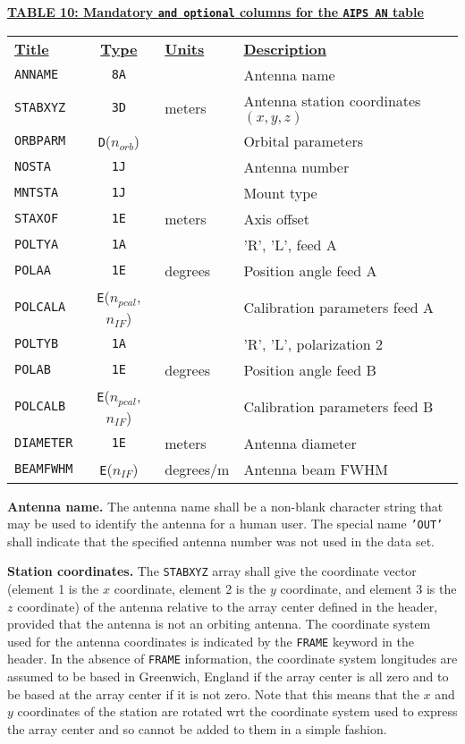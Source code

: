 \documentclass[twoside]{article}
\newcommand{\Me}[1]{\textcolor{mecol}{#1}}
\newcommand{\nif}{$n_{IF}$}
\newcommand{\norb}{$n_{orb}$}
\newcommand{\npcal}{$n_{pcal}$}
\begin{document}
\begin{center}
\underline{\bf{TABLE 10: Mandatory {\tt and optional} columns for
    the {\tt AIPS AN} table}}\\
\begin{tabular}{lcll}
\noalign{\vspace{2pt}} \label{ta:ANcols}
\underline{{\bf Title\vphantom{y}}} & \underline{\bf{Type}} &
   \underline{{\bf Units\vphantom{y}}} & \underline{\bf{Description}} \\
\noalign{\vspace{2pt}}
{\tt ANNAME}   & {\tt 8A} &          & Antenna name \\
{\tt STABXYZ}  & {\tt 3D} & meters   & Antenna station coordinates $(x,y,z)$ \\
{\tt ORBPARM}  & {\tt D}(\norb) &    & Orbital parameters \\
{\tt NOSTA}    & {\tt 1J} &          & Antenna number \\
{\tt MNTSTA}   & {\tt 1J} &          & Mount type \\
{\tt STAXOF}   & {\tt 1E} & meters   & Axis offset \\
{\tt POLTYA}   & {\tt 1A} &          & 'R', 'L', feed A \\
{\tt POLAA}    & {\tt 1E} & degrees  & Position angle feed A \\
{\tt POLCALA}  & {\tt E}(\npcal,\nif) &   & Calibration parameters feed A \\
{\tt POLTYB}   & {\tt 1A} &          & 'R', 'L', polarization 2 \\
{\tt POLAB}    & {\tt 1E} & degrees  & Position angle feed B \\
{\tt POLCALB}  & {\tt E}(\npcal,\nif) &   & Calibration parameters feed B \\
\hline
{\tt DIAMETER} & {\tt 1E} & meters   & Antenna diameter \\
{\tt BEAMFWHM} & {\tt E}(\nif) & degrees/m & Antenna beam FWHM
\end{tabular}
\end{center}

{\bf Antenna name.} The antenna name shall be a non-blank character
string that may be used to identify the antenna for a human user.  The
special name {\tt 'OUT'} shall indicate that the specified antenna
number was not used in the data set.

{\bf Station coordinates.} The {\tt STABXYZ} array shall give the
coordinate vector (element 1 is the $x$ coordinate, element 2 is the
$y$ coordinate, and element 3 is the $z$ coordinate) of the antenna
relative to the array center defined in the header, provided that the
antenna is not an orbiting antenna.  The coordinate system used for
the antenna coordinates is indicated by the {\tt FRAME} keyword in the
header.  In the absence of {\tt FRAME} information, the coordinate
system longitudes are assumed to be based in Greenwich, England if the
array center is all zero and to be based at the array center if it is
not zero.  \Me{Note that this means that the $x$ and $y$ coordinates
of the station are rotated wrt the coordinate system used to express
the array center and so cannot be added to them in a simple fashion.
\label{rev:AN2}}
\end{document}
